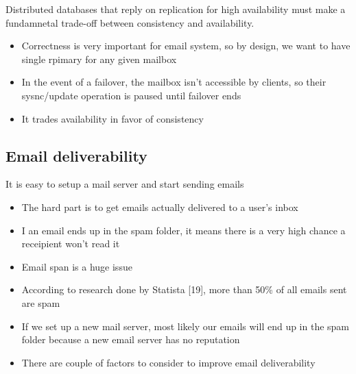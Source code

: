 \documentclass{report}
\theoremstyle{definition}
\let\oldsubsection\subsection
\renewcommand{\subsection}{\oldsubsection*}
\begin{document}
Distributed databases that reply on replication for high availability must make a fundamnetal trade-off between consistency and availability.

\begin{itemize}
\item
Correctness is very important for email system, so by design, we want to have single rpimary for any given mailbox
\item
In the event of a failover, the mailbox isn't accessible by clients,  so their sysnc/update operation is paused until failover ends
\item
It trades availability in favor of consistency
\end{itemize}

\subsection{Email deliverability}

It is easy to setup a mail server and start sending emails

\begin{itemize}
\item
The hard part is to get emails actually delivered to a user's inbox
\item
I an email ends up in the spam folder, it means there is a very high chance a receipient won't read it
\item
Email span is a huge issue
\item
According to research done by Statista [19], more than 50\% of all emails sent are spam
\item
If we set up a new mail server, most likely our emails will end up in the spam folder because a new email server has no reputation
\item
There are couple of factors to consider to improve email deliverability
\end{itemize}
\end{document}
